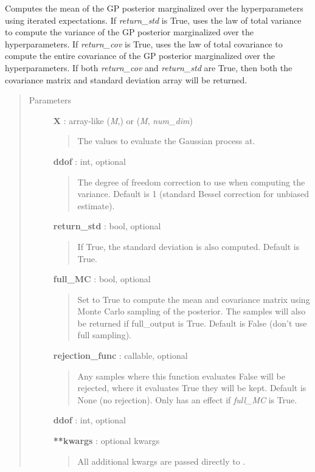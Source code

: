 \documentclass[letterpaper,10pt,english]{sphinxmanual}
\begin{document}
\begin{fulllineitems}
\begin{fulllineitems}
Computes the mean of the GP posterior marginalized over the
hyperparameters using iterated expectations. If \emph{return\_std} is True,
uses the law of total variance to compute the variance of the GP
posterior marginalized over the hyperparameters. If \emph{return\_cov} is True,
uses the law of total covariance to compute the entire covariance of the
GP posterior marginalized over the hyperparameters. If both \emph{return\_cov}
and \emph{return\_std} are True, then both the covariance matrix and standard
deviation array will be returned.
\begin{quote}\begin{description}
\item[{Parameters}] \leavevmode
\textbf{X} : array-like (\emph{M},) or (\emph{M}, \emph{num\_dim})
\begin{quote}

The values to evaluate the Gaussian process at.
\end{quote}

\textbf{ddof} : int, optional
\begin{quote}

The degree of freedom correction to use when computing the variance.
Default is 1 (standard Bessel correction for unbiased estimate).
\end{quote}

\textbf{return\_std} : bool, optional
\begin{quote}

If True, the standard deviation is also computed. Default is True.
\end{quote}

\textbf{full\_MC} : bool, optional
\begin{quote}

Set to True to compute the mean and covariance matrix using Monte
Carlo sampling of the posterior. The samples will also be returned
if full\_output is True. Default is False (don't use full sampling).
\end{quote}

\textbf{rejection\_func} : callable, optional
\begin{quote}

Any samples where this function evaluates False will be rejected,
where it evaluates True they will be kept. Default is None (no
rejection). Only has an effect if \emph{full\_MC} is True.
\end{quote}

\textbf{ddof} : int, optional

\textbf{**kwargs} : optional kwargs
\begin{quote}

All additional kwargs are passed directly to
{\hyperref[gptools:gptools.gaussian_process.GaussianProcess.compute_from_MCMC]{}}.
\end{quote}

\end{description}\end{quote}

\end{fulllineitems}


\end{fulllineitems}
\end{document}

